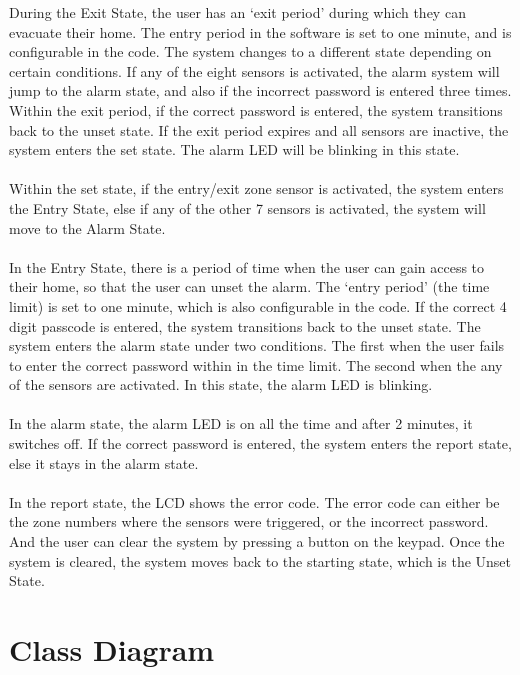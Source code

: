 \documentclass[aps, secnumarabic, balancelastpage, asmath, amssymb, nofootinbib, floatfix,]{revtex4-2}
\begin{document}
{During the Exit State, the user has an `exit period' during which they can evacuate their home. The entry period in the software is set to one minute, and is configurable in the code. The system changes to a different state depending on certain conditions. If any of the eight sensors is activated, the alarm system will jump to the alarm state, and also if the incorrect password is entered three times. Within the exit period, if the correct password is entered, the system transitions back to the unset state. If the exit period expires and all sensors are inactive, the system enters the set state. The alarm LED will be blinking in this state.\\
\\
Within the set state, if the entry/exit zone sensor is activated, the system enters the Entry State, else if any of the other 7 sensors is activated, the system will move to the Alarm State.\\
\\
In the Entry State, there is a period of time when the user can gain access to their home, so that the user can unset the alarm. The `entry period' (the time limit) is set to one minute, which is also configurable in the code. If the correct 4 digit passcode is entered, the system transitions back to the unset state. The system enters the alarm state under two conditions. The first when the user fails to enter the correct password within in the time limit. The second when the any of the sensors are activated. In this state, the alarm LED is blinking.\\
\\
In the alarm state, the alarm LED is on all the time and after 2 minutes, it switches off. If the correct password is entered, the system enters the report state, else it stays in the alarm state.\\
\\
In the report state, the LCD shows the error code. The error code can either be the zone numbers where the sensors were triggered, or the incorrect password. And the user can clear the system by pressing a button on the keypad. Once the system is cleared, the system moves back to the starting state, which is the Unset State.


\clearpage

\section{\fontsize{11.3pt}{12pt}\selectfont \bf Class Diagram}
\fontsize{11pt}{12pt}\selectfont
\label{sec:3}


}
\end{document}
